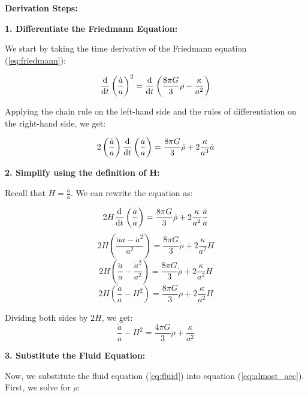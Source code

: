 \documentclass{article}
\begin{document}
\textbf{Derivation Steps:}

\textbf{1. Differentiate the Friedmann Equation:}

We start by taking the time derivative of the Friedmann equation (\ref{eq:friedmann}):

\begin{equation}
\dv{}{t} \left( \frac{\dot{a}}{a} \right)^2 = \dv{}{t} \left( \frac{8\pi G}{3} \rho - \frac{\kappa}{a^2} \right)
\end{equation}

Applying the chain rule on the left-hand side and the rules of differentiation on the right-hand side, we get:

\begin{equation}
2 \left( \frac{\dot{a}}{a} \right) \dv{}{t} \left( \frac{\dot{a}}{a} \right) = \frac{8\pi G}{3} \dot{\rho} + 2 \frac{\kappa}{a^3} \dot{a}
\end{equation}

\textbf{2. Simplify using the definition of H:}

Recall that $H = \frac{\dot{a}}{a}$. We can rewrite the equation as:

\begin{equation}
2H \dv{}{t} \left( \frac{\dot{a}}{a} \right) = \frac{8\pi G}{3} \dot{\rho} + 2 \frac{\kappa}{a^2} \frac{\dot{a}}{a}
\end{equation}
\begin{equation}
2H \left( \frac{\ddot{a}a - \dot{a}^2}{a^2} \right) = \frac{8\pi G}{3} \dot{\rho} + 2 \frac{\kappa}{a^2} H
\end{equation}
\begin{equation}
2H \left( \frac{\ddot{a}}{a} - \frac{\dot{a}^2}{a^2} \right) = \frac{8\pi G}{3} \dot{\rho} + 2 \frac{\kappa}{a^2} H
\end{equation}
\begin{equation}
2H \left( \frac{\ddot{a}}{a} - H^2 \right) = \frac{8\pi G}{3} \dot{\rho} + 2 \frac{\kappa}{a^2} H
\end{equation}

Dividing both sides by $2H$, we get:
\begin{equation}
\frac{\ddot{a}}{a} - H^2 = \frac{4\pi G}{3} \dot{\rho} + \frac{\kappa}{a^2}
\label{eq:almost_acc}
\end{equation}

\textbf{3. Substitute the Fluid Equation:}

Now, we substitute the fluid equation (\ref{eq:fluid}) into equation (\ref{eq:almost_acc}). First, we solve for $\dot{\rho}$:
\end{document}
